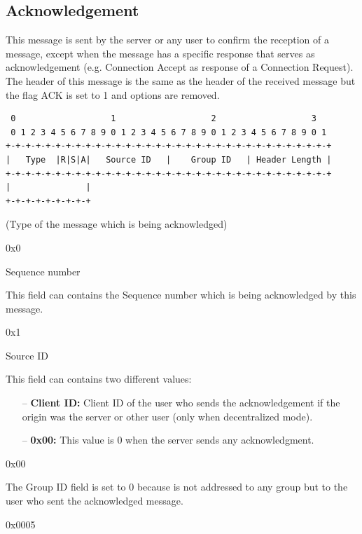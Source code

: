 \documentclass{article}
\begin{document}
\subsection{Acknowledgement}
This message is sent by the server or any user to confirm the reception of a message, except when the message has a specific response that serves as acknowledgement (e.g. Connection Accept as response of a Connection Request). The header of this message is the same as the header of the received message but the flag ACK is set to 1 and options are removed.
\begin{verbatim}  
 0                   1                   2                   3  
 0 1 2 3 4 5 6 7 8 9 0 1 2 3 4 5 6 7 8 9 0 1 2 3 4 5 6 7 8 9 0 1
+-+-+-+-+-+-+-+-+-+-+-+-+-+-+-+-+-+-+-+-+-+-+-+-+-+-+-+-+-+-+-+-+
|   Type  |R|S|A|   Source ID   |    Group ID   | Header Length |
+-+-+-+-+-+-+-+-+-+-+-+-+-+-+-+-+-+-+-+-+-+-+-+-+-+-+-+-+-+-+-+-+
|               |
+-+-+-+-+-+-+-+-+
\end{verbatim}
\begin{description}[align=left]
    \item [Type:] (Type of the message which is being acknowledged)
        
    \item [Reserved:] 0x0
        
    \item [Sequence:] Sequence number
    \begin{flushleft}
        This field can contains the Sequence number which is being acknowledged by this message.
    \end{flushleft}
    
    \item [Acknowledgement:] 0x1
    
    \item [Source ID:] Source ID
    \begin{flushleft}
        This field can contains two different values:
        \begin{itemize}
            \item[--]\textbf{Client ID: } Client ID of the user who sends the acknowledgement if the origin was the server or other user (only when decentralized mode).
            \item[--]\textbf{0x00: } This value is 0 when the server sends any acknowledgment.
        \end{itemize}
    \end{flushleft}
        
    \item [Group ID:] 0x00
    \begin{flushleft}
        The Group ID field is set to 0 because is not addressed to any group but to the user who sent the acknowledged message. 
    \end{flushleft}
    
    \item [Header Length:] 0x0005

\end{description}
\end{document}
